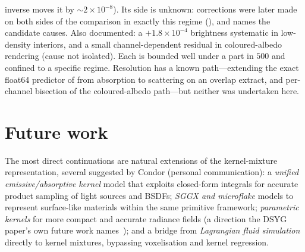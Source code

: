 \begin{itemize}
  inverse moves it by ${\sim}2\times10^{-8}$). Its side is unknown: corrections were later made
  on both sides of the comparison in exactly this regime (), and
   names the candidate causes. Also documented: a ${+}1.8\times10^{-4}$
  brightness systematic in low-density interiors, and a small channel-dependent residual in
  coloured-albedo rendering (cause not isolated). Each is bounded well under a part in
  $500$ and confined to a specific regime. Resolution has a known path---extending the exact
  float64 predictor of  from absorption to scattering on an overlap
  extract, and per-channel bisection of the coloured-albedo path---but neither was undertaken
  here.
\end{itemize}

\section{Future work}
\label{sec:future-work}

The most direct continuations are natural extensions of the kernel-mixture representation, several
suggested by Condor (personal communication): a \emph{unified emissive/absorptive kernel} model that exploits closed-form
integrals for accurate product sampling of light sources and BSDFs; \emph{SGGX and microflake} models
to represent surface-like materials within the same primitive framework; \emph{parametric kernels} for more compact and accurate radiance fields (a direction
the DSYG paper's own future work names~\cite{DSYG}); and a bridge from \emph{Lagrangian fluid simulation} directly
to kernel mixtures, bypassing voxelisation and kernel regression.

